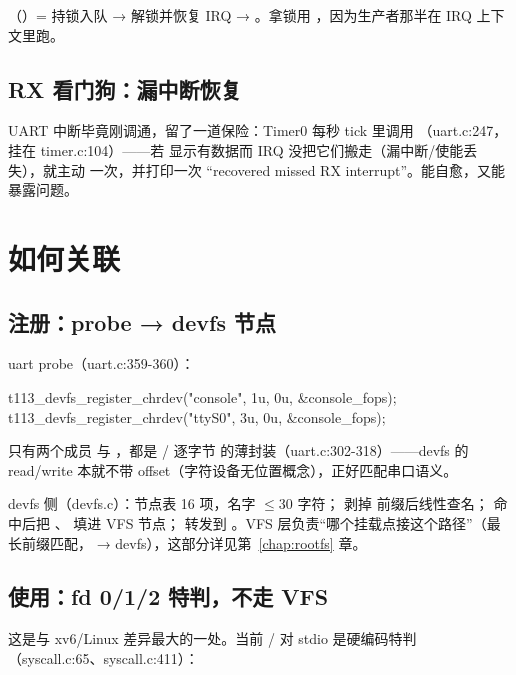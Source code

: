 （）= 持锁入队 → 解锁并恢复 IRQ → 。拿锁用 ，因为生产者那半在 IRQ 上下文里跑。

\subsection{RX 看门狗：漏中断恢复}

UART 中断毕竟刚调通，留了一道保险：Timer0 每秒 tick 里调用 （uart.c:247，挂在 timer.c:104）——若  显示有数据而 IRQ 没把它们搬走（漏中断/使能丢失），就主动  一次，并打印一次 ``recovered missed RX interrupt''。能自愈，又能暴露问题。

\section{ 如何关联}

\subsection{注册：probe → devfs 节点}

uart probe（uart.c:359-360）：

\begin{ccode}
t113_devfs_register_chrdev("console", 1u, 0u, &console_fops);
t113_devfs_register_chrdev("ttyS0",   3u, 0u, &console_fops);
\end{ccode}

 只有两个成员  与 ，都是  / 逐字节  的薄封装（uart.c:302-318）——devfs 的 read/write 本就不带 offset（字符设备无位置概念），正好匹配串口语义。

devfs 侧（devfs.c）：节点表 16 项，名字 $\leq$30 字符； 剥掉  前缀后线性查名； 命中后把 、 填进 VFS 节点； 转发到 。VFS 层负责``哪个挂载点接这个路径''（最长前缀匹配， → devfs），这部分详见第~\ref{chap:rootfs} 章。

\subsection{使用：fd 0/1/2 特判，不走 VFS}

这是与 xv6/Linux 差异最大的一处。当前 / 对 stdio 是硬编码特判（syscall.c:65、syscall.c:411）：

